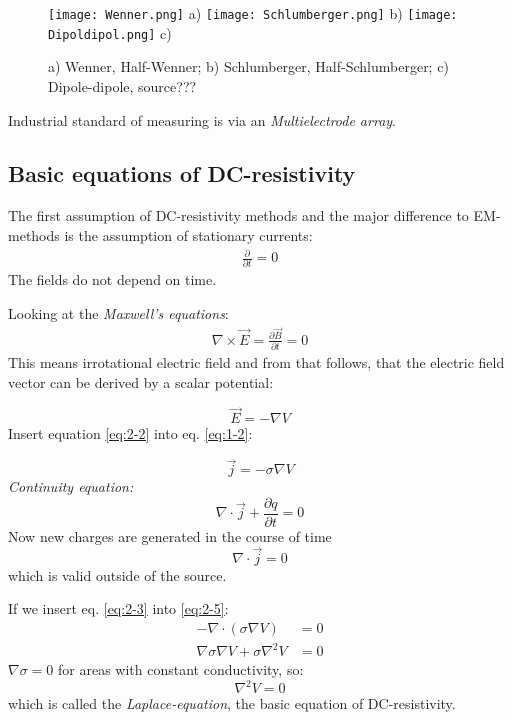 \begin{figure}[h!]
\begin{center}
\texttt{[image: Wenner.png]}
a)
\texttt{[image: Schlumberger.png]}
b)
\texttt{[image: Dipoldipol.png]}
c)
\caption{a) Wenner, Half-Wenner; b) Schlumberger, Half-Schlumberger; c) Dipole-dipole, source???}
\label{fig:dc02}
\end{center}
\end{figure}

Industrial standard of measuring is via an \textit{Multielectrode array}.


\subsection{Basic equations of DC-resistivity}
The first assumption of DC-resistivity methods and the major difference to EM-methods is the assumption of stationary currents:
\begin{align*}
\frac{\partial}{\partial t}=0
\end{align*}
The fields do not depend on time.

Looking at the \textit{Maxwell's equations}:
\begin{align}
\nabla\times\vec{E}=\frac{\partial \vec{B}}{\partial t}=0
\end{align}
This means irrotational electric field and from that follows, that the electric field vector can be derived by a scalar potential:

\begin{equation}
\vec{E}=-\nabla V \label{eq:2-2}
\end{equation}
Insert equation \eqref{eq:2-2} into eq. \eqref{eq:1-2}:

\begin{equation}
\vec{j}=-\sigma \nabla V\label{eq:2-3}
\end{equation}
\textit{Continuity equation:}
\begin{equation}
\nabla\cdot\vec{j}+\frac{\partial q}{\partial t}=0
\end{equation}
Now new charges are generated in the course of time
\begin{equation}
\nabla\cdot\vec{j}=0 \label{eq:2-5}
\end{equation}
which is valid outside of the source.

If we insert eq. \eqref{eq:2-3} into \eqref{eq:2-5}:
\begin{align*}
-\nabla\cdot(\sigma\nabla V)&=0\\
\nabla\sigma\nabla V + \sigma\nabla^2V&=0
\end{align*}
$\nabla\sigma=0$ for areas with constant conductivity, so:
\begin{equation}
\nabla^2 V=0\label{eq:lapleq}
\end{equation}
which is called the \textit{Laplace-equation}, the basic equation of DC-resistivity.

